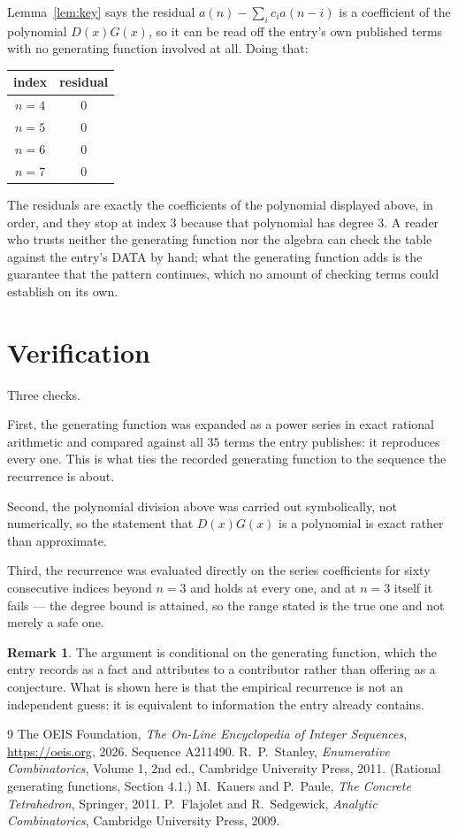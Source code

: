 \documentclass[11pt,a4paper]{article}
\theoremstyle{plain}
\theoremstyle{definition}
\newtheorem{remark}[theorem]{Remark}
\begin{document}
Lemma~\ref{lem:key} says the residual $a(n)-\sum_ic_ia(n-i)$ is a coefficient of the
polynomial $D(x)G(x)$, so it can be read off the entry's own published terms with no
generating function involved at all. Doing that:
\begin{center}
\begin{tabular}{cc}
index & residual \\ \hline
$n=4$ & $0$ \\
$n=5$ & $0$ \\
$n=6$ & $0$ \\
$n=7$ & $0$
\end{tabular}
\end{center}
The residuals are exactly the coefficients of the polynomial displayed above, in order, and
they stop at index $3$ because that polynomial has degree $3$. A reader who trusts
neither the generating function nor the algebra can check the table against the entry's DATA
by hand; what the generating function adds is the guarantee that the pattern continues, which
no amount of checking terms could establish on its own.

\section{Verification}

Three checks.

First, the generating function was expanded as a power series in exact rational arithmetic and
compared against all $35$ terms the entry publishes: it reproduces every one. This is
what ties the recorded generating function to the sequence the recurrence is about.

Second, the polynomial division above was carried out symbolically, not numerically, so the
statement that $D(x)G(x)$ is a polynomial is exact rather than approximate.

Third, the recurrence was evaluated directly on the series coefficients for sixty consecutive
indices beyond $n=3$ and holds at every one, and at $n=3$ itself it fails --- the
degree bound is attained, so the range stated is the true one and not merely a safe one.

\begin{remark}
The argument is conditional on the generating function, which the entry records as a fact and
attributes to a contributor rather than offering as a conjecture. What is shown here is that
the empirical recurrence is not an independent guess: it is equivalent to information the
entry already contains.
\end{remark}

\begin{thebibliography}{9}
 The OEIS Foundation, \emph{The On-Line Encyclopedia of Integer
Sequences}, \url{https://oeis.org}, 2026. Sequence A211490.
 R.~P.~Stanley, \emph{Enumerative Combinatorics}, Volume 1, 2nd ed.,
Cambridge University Press, 2011. (Rational generating functions, Section 4.1.)
 M.~Kauers and P.~Paule, \emph{The Concrete Tetrahedron}, Springer, 2011.
 P.~Flajolet and R.~Sedgewick, \emph{Analytic Combinatorics}, Cambridge
University Press, 2009.
\end{thebibliography}
\end{document}
